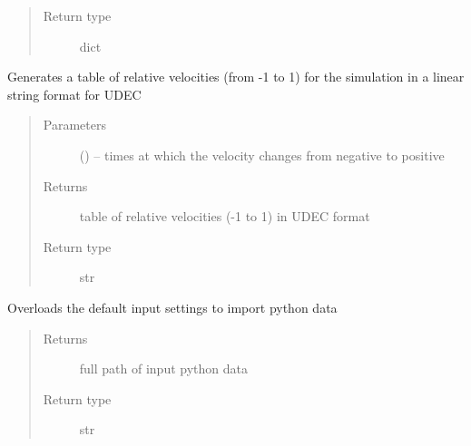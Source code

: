 \documentclass[letterpaper,10pt,english]{sphinxmanual}
\begin{document}
\begin{fulllineitems}
\begin{fulllineitems}
\begin{quote}
\begin{description}
\item[{Return type}] \leavevmode
dict

\end{description}\end{quote}

\end{fulllineitems}


\begin{fulllineitems}
\label{\detokenize{MouseReferenceManual:Modules.Module_UDEC.Module_UDEC.getVelocityString}}
Generates a table of relative velocities (from -1 to 1) for the simulation in a linear string format for UDEC
\begin{quote}\begin{description}
\item[{Parameters}] \leavevmode
{} () -- times at which the velocity changes from negative to positive

\item[{Returns}] \leavevmode
table of relative velocities (-1 to 1) in UDEC format

\item[{Return type}] \leavevmode
str

\end{description}\end{quote}

\end{fulllineitems}


\begin{fulllineitems}
\label{\detokenize{MouseReferenceManual:Modules.Module_UDEC.Module_UDEC.inputFileName}}
Overloads the default input settings to import python data
\begin{quote}\begin{description}
\item[{Returns}] \leavevmode
full path of input python data

\item[{Return type}] \leavevmode
str

\end{description}\end{quote}


\end{fulllineitems}
\end{fulllineitems}
\end{document}
